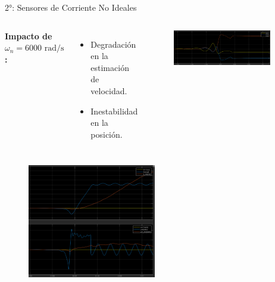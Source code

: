 \documentclass[12pt]{beamer}
\begin{document}
\begin{frame}{2°: Sensores de Corriente No Ideales}
    \begin{columns}
        \textbf{Impacto de \(\omega_n = 6000 \text{ rad/s}\):}
        \begin{itemize}
            \item Degradación en la estimación de velocidad.
            \item Inestabilidad en la posición.
        \end{itemize}

        \begin{figure}
            \centering
            \includegraphics[width=0.9\textwidth]{Imagenes/7_corNI_6000_c.png}
        \end{figure}
    \end{columns}

    \begin{figure}
        \centering
        \includegraphics[width=0.5\textwidth]{Imagenes/8_corNI_6000_pw.png}
    \end{figure}
\end{frame}
\end{document}
